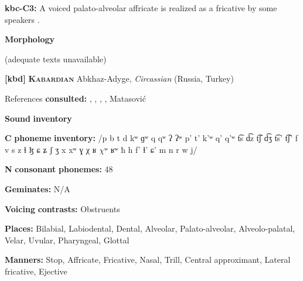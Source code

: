 \documentclass[output=paper]{langsci/langscibook}
\begin{document}
\begin{styleBody}
\textbf{kbc-C3:} A voiced palato-alveolar affricate is realized as a fricative by some speakers \citep[15-16]{Sandalo1997}.
\end{styleBody}

\begin{styleBody}
\textbf{Morphology}
\end{styleBody}

\begin{styleBody}
(adequate texts unavailable)
\end{styleBody}

\begin{styleBody}
\textbf{[kbd]}   \textbf{\textsc{Kabardian}}  Abkhaz-Adyge, \textit{Circassian} (Russia, Turkey)
\end{styleBody}

\begin{styleBody}
References \textbf{consulted:} \citet{Applebaum2013}, \citet{Colarusso2006}, \citet{GordonApplebaum2010}, \citet{Kuipers1960}, Matasović 
\end{styleBody}

\begin{styleBody}
\textbf{Sound} \textbf{inventory}
\end{styleBody}

\begin{styleBody}
\textbf{C} \textbf{phoneme} \textbf{inventory:} /p b t d kʷ ɡʷ q qʷ ʔ ʔʷ p’ t’ k’ʷ q’ q’ʷ t͡s d͡z t͡ʃ d͡ʒ t͡s’ t͡ʃ’ f v s z ɬ ɮ ɕ ʑ ʃ ʒ x xʷ ɣ χ ʁ $\chi ʷ$ ʁʷ ħ h f' ɬ’ ɕ' m n r w j/
\end{styleBody}

\begin{styleBody}
\textbf{N} \textbf{consonant} \textbf{phonemes:} 48
\end{styleBody}

\begin{styleBody}
\textbf{Geminates:} N/A
\end{styleBody}

\begin{styleBody}
\textbf{Voicing} \textbf{contrasts:} Obstruents
\end{styleBody}

\begin{styleBody}
\textbf{Places:} Bilabial, Labiodental, Dental, Alveolar, Palato-alveolar, Alveolo-palatal, Velar, Uvular, Pharyngeal, Glottal
\end{styleBody}

\begin{styleBody}
\textbf{Manners:} Stop, Affricate, Fricative, Nasal, Trill, Central approximant, Lateral fricative, Ejective
\end{styleBody}
\end{document}
